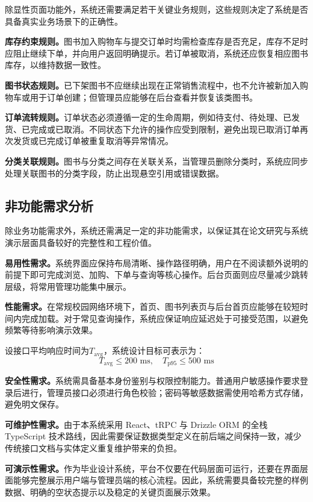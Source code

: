 \documentclass[12pt,a4paper]{ctexart}
\begin{document}
除显性页面功能外，系统还需要满足若干关键业务规则，这些规则决定了系统是否具备真实业务场景下的正确性。

\textbf{库存约束规则。}图书加入购物车与提交订单时均需检查库存是否充足，库存不足时应阻止继续下单，并向用户返回明确提示。若订单被取消，系统还应恢复相应图书库存，以维持数据一致性。

\textbf{图书状态规则。}已下架图书不应继续出现在正常销售流程中，也不允许被新加入购物车或用于订单创建；但管理员应能够在后台查看并恢复该类图书。

\textbf{订单流转规则。}订单状态必须遵循一定的生命周期，例如待支付、待处理、已发货、已完成或已取消。不同状态下允许的操作应受到限制，避免出现已取消订单再次发货或已完成订单被重复取消等异常情况。

\textbf{分类关联规则。}图书与分类之间存在关联关系，当管理员删除分类时，系统应同步处理关联图书的分类字段，防止出现悬空引用或错误数据。

\subsection{非功能需求分析}

除业务功能需求外，系统还需满足一定的非功能需求，以保证其在论文研究与系统演示层面具备较好的完整性和工程价值。

\textbf{易用性需求。}系统界面应保持布局清晰、操作路径明确，用户在不阅读额外说明的前提下即可完成浏览、加购、下单与查询等核心操作。后台页面则应尽量减少跳转层级，将常用管理功能集中展示。

\textbf{性能需求。}在常规校园网络环境下，首页、图书列表页与后台首页应能够在较短时间内完成加载。对于常见查询操作，系统应保证响应延迟处于可接受范围，以避免频繁等待影响演示效果。

设接口平均响应时间为$T_{\text{avg}}$，系统设计目标可表示为：
\begin{equation}
  T_{\text{avg}} \leq 200\text{ ms},\quad T_{\text{p95}} \leq 500\text{ ms}
  \label{eq:perf-target}
\end{equation}

\textbf{安全性需求。}系统需具备基本身份鉴别与权限控制能力。普通用户敏感操作要求登录后进行，管理员接口必须进行角色校验；密码等敏感数据需使用哈希方式存储，避免明文保存。

\textbf{可维护性需求。}由于本系统采用 React、tRPC 与 Drizzle ORM 的全栈 TypeScript 技术路线，因此需要保证数据类型定义在前后端之间保持一致，减少传统接口文档与实体定义重复维护带来的负担。

\textbf{可演示性需求。}作为毕业设计系统，平台不仅要在代码层面可运行，还要在界面层面能够完整展示用户端与管理员端的核心流程。因此，系统需要具备较完整的样例数据、明确的空状态提示以及稳定的关键页面展示效果。
\end{document}
